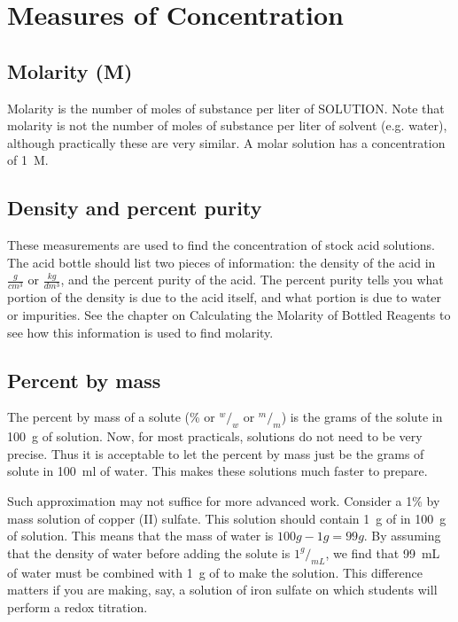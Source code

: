 \chapter{Measures of Concentration}

\section{Molarity (M)}

Molarity is the number of moles of substance per liter of SOLUTION. Note that molarity is not the number of moles of substance per liter of solvent (e.g. water), although practically these are very similar. A molar solution has a concentration of 1~M.

\section{Density and percent purity}

These measurements are used to find the concentration of stock acid solutions. The acid bottle should list two pieces of information: the density of the acid in $\frac{g}{cm^3}$ or $\frac{kg}{dm^3}$, and the percent purity of the acid. The percent purity tells you what portion of the density is due to the acid itself, and what portion is due to water or impurities. See the chapter on Calculating the Molarity of Bottled Reagents to see how this information is used to find molarity.

\section{Percent by mass}

The percent by mass of a solute (\% or $^w/_w$ or $^m/_m$) is the grams of the solute in 100~g of solution. Now, for most practicals, solutions do not need to be very precise. Thus it is acceptable to let the percent by mass just be the grams of solute in 100~ml of water. This makes these solutions much faster to prepare.

Such approximation may not suffice for more advanced work. Consider a 1\% by mass solution of copper (II) sulfate. This solution should contain 1~g of  in 100~g of solution. This means that the mass of water is $100 g - 1 g = 99 g$. By assuming that the density of water before adding the solute is $1 ^g/_{mL}$, we find that 99~mL of water must be combined with 1~g of  to make the solution. This difference matters if you are making, say, a solution of iron sulfate on which students will perform a redox titration. 

